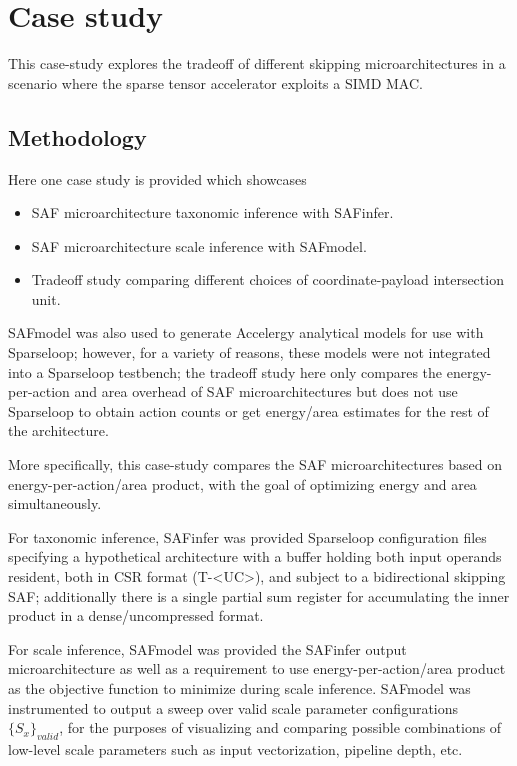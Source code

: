 \chapter{Case study}
\label{chapter:case_studies}

This case-study explores the tradeoff of different skipping microarchitectures in a scenario where the sparse tensor accelerator exploits a SIMD MAC.

\section{Methodology}

 Here one case study is provided which showcases

\begin{itemize}
    \item SAF microarchitecture taxonomic inference with SAFinfer.
    \item SAF microarchitecture scale inference with SAFmodel.
    \item Tradeoff study comparing different choices of coordinate-payload intersection unit.
\end{itemize}

SAFmodel was also used to generate Accelergy analytical models for use with Sparseloop; however, for a variety of reasons, these models were not integrated into a Sparseloop testbench; the tradeoff study here only compares the energy-per-action and area overhead of SAF microarchitectures but does not use Sparseloop to obtain action counts or get energy/area estimates for the rest of the architecture.

More specifically, this case-study compares the SAF microarchitectures based on energy-per-action/area product, with the goal of optimizing energy and area simultaneously. 

For taxonomic inference, SAFinfer was provided Sparseloop configuration files specifying a hypothetical architecture with a buffer holding both input operands resident, both in CSR format (T-<UC>), and subject to a bidirectional skipping SAF; additionally there is a single partial sum register for accumulating the inner product in a dense/uncompressed format.

For scale inference, SAFmodel was provided the SAFinfer output microarchitecture as well as a requirement to use energy-per-action/area product as the objective function to minimize during scale inference. SAFmodel was instrumented to output a sweep over valid scale parameter configurations $\{S_x\}_{valid}$, for the purposes of visualizing and comparing possible combinations of low-level scale parameters such as input vectorization, pipeline depth, etc.

